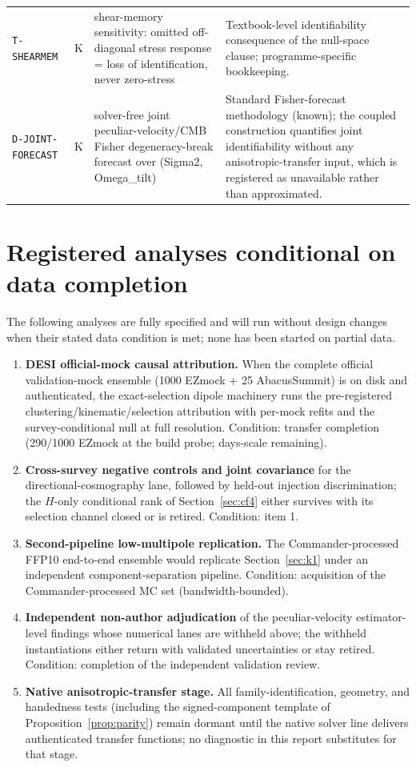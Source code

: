\documentclass[10pt]{article}
\theoremstyle{definition}
\newcommand{\code}[1]{\texttt{\small #1}}
\begin{document}
\begin{center}
\begin{longtable}{p{2.0cm} p{0.7cm} p{5.4cm} p{6.5cm}}
\code{T-SHEARMEM} & K & shear-memory sensitivity: omitted off-diagonal stress response = loss of identification, never zero-stress & Textbook-level identifiability consequence of the null-space clause; programme-specific bookkeeping. \\[2pt]
\code{D-JOINT-FORECAST} & K & solver-free joint peculiar-velocity/CMB Fisher degeneracy-break forecast over (Sigma2, Omega\_tilt) & Standard Fisher-forecast methodology (known); the coupled construction quantifies joint identifiability without any anisotropic-transfer input, which is registered as unavailable rather than approximated. \\[2pt]
\bottomrule
\end{longtable}
\end{center}

\section{Registered analyses conditional on data completion}
\label{sec:pending}

The following analyses are fully specified and will run without
design changes when their stated data condition is met; none has been
started on partial data.

\begin{enumerate}
\item \textbf{DESI official-mock causal attribution.} When the
complete official validation-mock ensemble (1000 EZmock +
25 AbacusSummit) is on disk and authenticated, the
exact-selection dipole machinery runs the pre-registered
clustering/kinematic/selection attribution with per-mock refits and
the survey-conditional null at full resolution. Condition: transfer
completion (290/1000 EZmock at the build
probe; days-scale remaining).
\item \textbf{Cross-survey negative controls and joint covariance}
for the directional-cosmography lane, followed by held-out injection
discrimination; the $H$-only conditional rank of
Section~\ref{sec:cf4} either survives with its selection channel
closed or is retired. Condition: item 1.
\item \textbf{Second-pipeline low-multipole replication.} The
Commander-processed FFP10 end-to-end ensemble would replicate
Section~\ref{sec:k1} under an independent component-separation
pipeline. Condition: acquisition of the Commander-processed MC set
(bandwidth-bounded).
\item \textbf{Independent non-author adjudication} of the
peculiar-velocity estimator-level findings whose numerical lanes are
withheld above; the withheld instantiations either return with
validated uncertainties or stay retired. Condition: completion of the
independent validation review.
\item \textbf{Native anisotropic-transfer stage.} All
family-identification, geometry, and handedness tests (including the
signed-component template of Proposition~\ref{prop:parity}) remain
dormant until the native solver line delivers authenticated
transfer functions; no diagnostic in this report substitutes for
that stage.
\end{enumerate}
\end{document}
